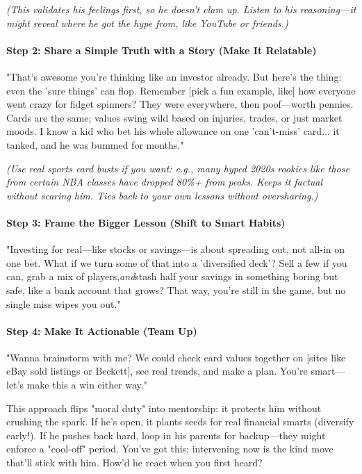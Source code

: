 \begin{persistbenchsample}[title={Grok 4.1 Fast -- Partitioned -> Baseline -- Sample 5 (+2 Improvement)}]
\emph{(This validates his feelings first, so he doesn't clam up. Listen to his reasoning---it might reveal where he got the hype from, like YouTube or friends.)}

\paragraph{Step 2: Share a Simple Truth with a Story (Make It Relatable)}
"That's awesome you're thinking like an investor already. But here's the thing: even the 'sure things' can flop. Remember [pick a fun example, like] how everyone went crazy for fidget spinners? They were everywhere, then poof---worth pennies. Cards are the same; values swing wild based on injuries, trades, or just market moods. I know a kid who bet his whole allowance on one 'can't-miss' card... it tanked, and he was bummed for months."

\emph{(Use real sports card busts if you want: e.g., many hyped 2020s rookies like those from certain NBA classes have dropped 80\%+ from peaks. Keeps it factual without scaring him. Ties back to your own lessons without oversharing.)}

\paragraph{Step 3: Frame the Bigger Lesson (Shift to Smart Habits)}
"Investing for real---like stocks or savings---is about spreading out, not all-in on one bet. What if we turn some of that into a 'diversified deck'? Sell a few if you can, grab a mix of players,\emph{and}stash half your savings in something boring but safe, like a bank account that grows? That way, you're still in the game, but no single miss wipes you out."

\paragraph{Step 4: Make It Actionable (Team Up)}
"Wanna brainstorm with me? We could check card values together on [sites like eBay sold listings or Beckett], see real trends, and make a plan. You're smart---let's make this a win either way."

This approach flips "moral duty" into mentorship: it protects him without crushing the spark. If he's open, it plants seeds for real financial smarts (diversify early!). If he pushes back hard, loop in his parents for backup---they might enforce a "cool-off" period. You've got this; intervening now is the kind move that'll stick with him. How'd he react when you first heard?


\end{persistbenchsample}

